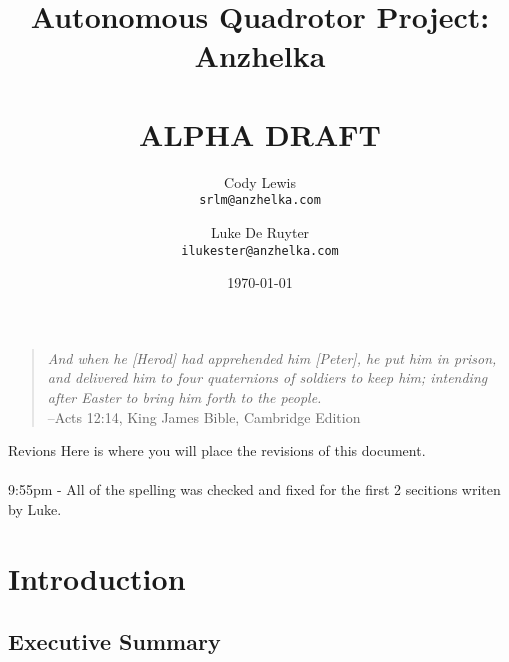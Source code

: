 \documentclass{article}
\numberwithin{equation}{section} %
\begin{document}
\title{Autonomous Quadrotor Project: \\ Anzhelka \\ \- \\ {\bf ALPHA DRAFT}}
\author{Cody Lewis \\ \texttt{srlm@anzhelka.com} \and Luke De Ruyter \\ \texttt{ilukester@anzhelka.com} }
\date{\today}
\maketitle
\begin{verse}\textit{
And when he [Herod] had apprehended him [Peter], he put him in prison, and delivered him to four quaternions of soldiers to keep him; intending after Easter to bring him forth to the people.} \\
\hfill --Acts 12:14, King James Bible, Cambridge Edition
\end{verse}

\newpage
{}
\begin{paragraph}{Revions}
{
Here is where you will place the revisions of this document. \\ \\
9:55pm - All of the spelling was checked and fixed for the first 2 secitions writen by Luke.
}
\end{paragraph}

\newpage
\renewcommand{\contentsname}{Table of Contents}
\tableofcontents
{}
\newpage



\section{Introduction}

\subsection{Executive Summary}
\end{document}
